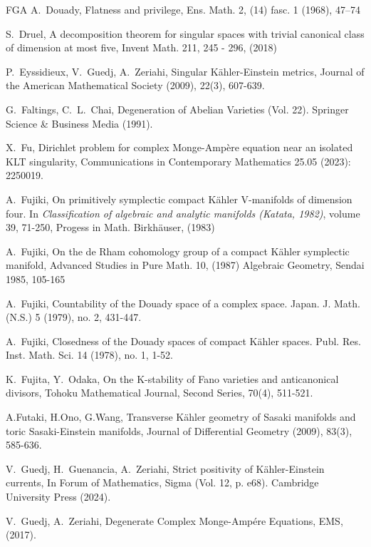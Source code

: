 \documentclass[12pt,a4paper]{amsart}
\theoremstyle{remark}
\theoremstyle{definition}
\begin{document}
\begin{thebibliography}{FGA}
A.~Douady, 
Flatness and privilege, Ens. Math. 2, (14) fasc. 1 (1968), 47--74 

  S.~Druel, A decomposition theorem for singular spaces with trivial canonical class of dimension at most 
five, Invent Math. 211, 245 - 296, (2018)

P.~Eyssidieux, V.~Guedj, A.~Zeriahi, Singular K\"ahler-Einstein metrics, Journal of the American Mathematical Society (2009), 22(3), 607-639.

G.~Faltings, C.~L.~Chai, 
Degeneration of Abelian Varieties (Vol. 22). Springer Science \& Business Media (1991). 

X.~Fu, Dirichlet problem for complex Monge-Amp\`{e}re equation near an isolated KLT singularity, 
Communications in Contemporary Mathematics 25.05 (2023): 2250019.


A.~Fujiki, On primitively symplectic compact K\"ahler V-manifolds of dimension four. In {\em Classification of algebraic and analytic manifolds (Katata, 1982)}, volume 39, 71-250, Progess in Math. Birkh\"auser, (1983)

A.~Fujiki, On the de Rham cohomology group of a compact K\"ahler symplectic manifold, 
Advanced Studies in Pure Math. 10, (1987) Algebraic Geometry, Sendai 1985, 105-165

A.~Fujiki, 
Countability of the Douady space of a complex space.
Japan. J. Math. (N.S.) 5 (1979), no. 2, 431-447.

A.~Fujiki, Closedness of the Douady spaces of compact K\"ahler spaces. Publ. Res. Inst. Math. Sci. 14 (1978), no. 1, 1-52. 

K.~Fujita, Y.~Odaka, 
On the K-stability of Fano varieties and 
anticanonical divisors, 
Tohoku Mathematical Journal, Second 
Series, 70(4), 511-521. 

A.Futaki, H.Ono, G.Wang, 
Transverse K\"ahler geometry of Sasaki manifolds and toric Sasaki-Einstein manifolds, Journal of Differential Geometry (2009), 83(3), 585-636. 

V.~Guedj, H.~Guenancia, A.~Zeriahi, 
Strict positivity of K\"ahler-Einstein currents, In Forum of Mathematics, Sigma (Vol. 12, p. e68). Cambridge University Press (2024). 

V.~Guedj, A.~Zeriahi, 
Degenerate Complex Monge-Amp\'ere Equations, EMS, (2017). 


\end{thebibliography}
\end{document}
